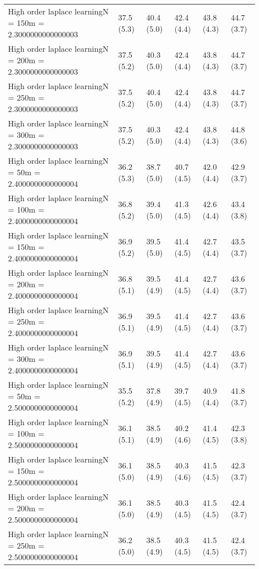 \documentclass{article}
\begin{document}
\begin{table*}[t!]
\begin{center}
\begin{small}
\begin{sc}
\begin{tabular}{llllll}
High order laplace learningN = 150m = 2.3000000000000003&37.5 (5.3)      &40.4 (5.0)      &42.4 (4.4)      &43.8 (4.3)      &44.7 (3.7)      \\
High order laplace learningN = 200m = 2.3000000000000003&37.5 (5.2)      &40.3 (5.0)      &42.4 (4.4)      &43.8 (4.3)      &44.7 (3.7)      \\
High order laplace learningN = 250m = 2.3000000000000003&37.5 (5.2)      &40.4 (5.0)      &42.4 (4.4)      &43.8 (4.3)      &44.7 (3.7)      \\
High order laplace learningN = 300m = 2.3000000000000003&37.5 (5.2)      &40.3 (5.0)      &42.4 (4.4)      &43.8 (4.3)      &44.8 (3.6)      \\
High order laplace learningN = 50m = 2.4000000000000004&36.2 (5.3)      &38.7 (5.0)      &40.7 (4.5)      &42.0 (4.4)      &42.9 (3.7)      \\
High order laplace learningN = 100m = 2.4000000000000004&36.8 (5.2)      &39.4 (5.0)      &41.3 (4.5)      &42.6 (4.4)      &43.4 (3.8)      \\
High order laplace learningN = 150m = 2.4000000000000004&36.9 (5.2)      &39.5 (5.0)      &41.4 (4.5)      &42.7 (4.4)      &43.5 (3.7)      \\
High order laplace learningN = 200m = 2.4000000000000004&36.8 (5.1)      &39.5 (4.9)      &41.4 (4.5)      &42.7 (4.4)      &43.6 (3.7)      \\
High order laplace learningN = 250m = 2.4000000000000004&36.9 (5.1)      &39.5 (4.9)      &41.4 (4.5)      &42.7 (4.4)      &43.6 (3.7)      \\
High order laplace learningN = 300m = 2.4000000000000004&36.9 (5.1)      &39.5 (4.9)      &41.4 (4.5)      &42.7 (4.4)      &43.6 (3.7)      \\
High order laplace learningN = 50m = 2.5000000000000004&35.5 (5.2)      &37.8 (4.9)      &39.7 (4.5)      &40.9 (4.4)      &41.8 (3.7)      \\
High order laplace learningN = 100m = 2.5000000000000004&36.1 (5.1)      &38.5 (4.9)      &40.2 (4.6)      &41.4 (4.5)      &42.3 (3.8)      \\
High order laplace learningN = 150m = 2.5000000000000004&36.1 (5.0)      &38.5 (4.9)      &40.3 (4.6)      &41.5 (4.5)      &42.3 (3.7)      \\
High order laplace learningN = 200m = 2.5000000000000004&36.1 (5.0)      &38.5 (4.9)      &40.3 (4.5)      &41.5 (4.5)      &42.4 (3.7)      \\
High order laplace learningN = 250m = 2.5000000000000004&36.2 (5.0)      &38.5 (4.9)      &40.3 (4.5)      &41.5 (4.5)      &42.4 (3.7)      \\

\end{tabular}
\end{sc}
\end{small}
\end{center}
\end{table*}
\end{document}
